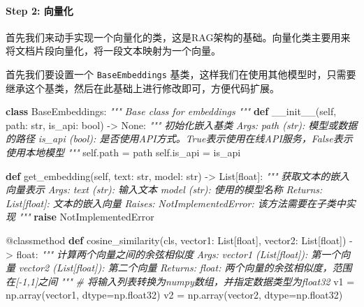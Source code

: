 \documentclass[
]{article}
\newenvironment{Shaded}{}{}
\newcommand{\AttributeTok}[1]{\textcolor[rgb]{0.49,0.56,0.16}{#1}}
\newcommand{\BuiltInTok}[1]{\textcolor[rgb]{0.00,0.50,0.00}{#1}}
\newcommand{\CommentTok}[1]{\textcolor[rgb]{0.38,0.63,0.69}{\textit{#1}}}
\newcommand{\ControlFlowTok}[1]{\textcolor[rgb]{0.00,0.44,0.13}{\textbf{#1}}}
\newcommand{\FunctionTok}[1]{\textcolor[rgb]{0.02,0.16,0.49}{#1}}
\newcommand{\KeywordTok}[1]{\textcolor[rgb]{0.00,0.44,0.13}{\textbf{#1}}}
\newcommand{\NormalTok}[1]{#1}
\newcommand{\OperatorTok}[1]{\textcolor[rgb]{0.40,0.40,0.40}{#1}}
\newcommand{\PreprocessorTok}[1]{\textcolor[rgb]{0.74,0.48,0.00}{#1}}
\newcommand{\VariableTok}[1]{\textcolor[rgb]{0.10,0.09,0.49}{#1}}
\begin{document}
\paragraph{Step 2: 向量化}\label{step-2-ux5411ux91cfux5316}

首先我们来动手实现一个向量化的类，这是RAG架构的基础。向量化类主要用来将文档片段向量化，将一段文本映射为一个向量。

首先我们要设置一个 \texttt{BaseEmbeddings}
基类，这样我们在使用其他模型时，只需要继承这个基类，然后在此基础上进行修改即可，方便代码扩展。

\begin{Shaded}
\begin{Highlighting}[]
\KeywordTok{class}\NormalTok{ BaseEmbeddings:}
    \CommentTok{"""}
\CommentTok{    Base class for embeddings}
\CommentTok{    """}
    \KeywordTok{def} \FunctionTok{\_\_init\_\_}\NormalTok{(}\VariableTok{self}\NormalTok{, path: }\BuiltInTok{str}\NormalTok{, is\_api: }\BuiltInTok{bool}\NormalTok{) }\OperatorTok{{-}\textgreater{}} \VariableTok{None}\NormalTok{:}
        \CommentTok{"""}
\CommentTok{        初始化嵌入基类}
\CommentTok{        Args:}
\CommentTok{            path (str): 模型或数据的路径}
\CommentTok{            is\_api (bool): 是否使用API方式。True表示使用在线API服务，False表示使用本地模型}
\CommentTok{        """}
        \VariableTok{self}\NormalTok{.path }\OperatorTok{=}\NormalTok{ path}
        \VariableTok{self}\NormalTok{.is\_api }\OperatorTok{=}\NormalTok{ is\_api}
    
    \KeywordTok{def}\NormalTok{ get\_embedding(}\VariableTok{self}\NormalTok{, text: }\BuiltInTok{str}\NormalTok{, model: }\BuiltInTok{str}\NormalTok{) }\OperatorTok{{-}\textgreater{}}\NormalTok{ List[}\BuiltInTok{float}\NormalTok{]:}
        \CommentTok{"""}
\CommentTok{        获取文本的嵌入向量表示}
\CommentTok{        Args:}
\CommentTok{            text (str): 输入文本}
\CommentTok{            model (str): 使用的模型名称}
\CommentTok{        Returns:}
\CommentTok{            List[float]: 文本的嵌入向量}
\CommentTok{        Raises:}
\CommentTok{            NotImplementedError: 该方法需要在子类中实现}
\CommentTok{        """}
        \ControlFlowTok{raise} \PreprocessorTok{NotImplementedError}
    
    \AttributeTok{@classmethod}
    \KeywordTok{def}\NormalTok{ cosine\_similarity(cls, vector1: List[}\BuiltInTok{float}\NormalTok{], vector2: List[}\BuiltInTok{float}\NormalTok{]) }\OperatorTok{{-}\textgreater{}} \BuiltInTok{float}\NormalTok{:}
        \CommentTok{"""}
\CommentTok{        计算两个向量之间的余弦相似度}
\CommentTok{        Args:}
\CommentTok{            vector1 (List[float]): 第一个向量}
\CommentTok{            vector2 (List[float]): 第二个向量}
\CommentTok{        Returns:}
\CommentTok{            float: 两个向量的余弦相似度，范围在[{-}1,1]之间}
\CommentTok{        """}
        \CommentTok{\# 将输入列表转换为numpy数组，并指定数据类型为float32}
\NormalTok{        v1 }\OperatorTok{=}\NormalTok{ np.array(vector1, dtype}\OperatorTok{=}\NormalTok{np.float32)}
\NormalTok{        v2 }\OperatorTok{=}\NormalTok{ np.array(vector2, dtype}\OperatorTok{=}\NormalTok{np.float32)}


\end{Highlighting}
\end{Shaded}
\end{document}
